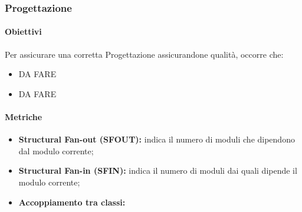 \subsubsection{Progettazione}
\paragraph{Obiettivi}
Per assicurare una corretta Progettazione assicurandone qualità, occorre che:
\begin{itemize}
	\item DA FARE
	\item DA FARE
\end{itemize}
\paragraph{Metriche}
\begin{itemize}
	\item \textbf{Structural Fan-out (SFOUT):} indica il numero di moduli che dipendono dal modulo corrente;
	\item \textbf{Structural Fan-in (SFIN):} indica il numero di moduli dai quali dipende il modulo corrente;
	\item \textbf{Accoppiamento tra classi:} 	
\end{itemize}